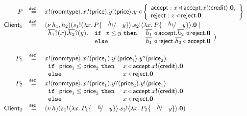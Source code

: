 \newcommand{\rtype}{\mathsf{roomtype}}
\newcommand{\price}{\mathsf{price}}
\newcommand{\accept}{\mathsf{accept}}
\newcommand{\reject}{\mathsf{reject}}
\newcommand{\creditc}{\mathsf{credit}}

\newcommand{\Client}{\mathsf{Client}}

\[
	\begin{array}{rcl}
		P &\defeq& \bout{x}{\rtype} \binp{x}{\price} \bout{y}{\price}
		y \triangleleft \left\{
				\begin{array}{l}
					\accept: \bsel{x}{\accept} \bout{x}{\creditc} \inact,\\
					\reject: \bsel{x}{\reject} \inact
				\end{array}
				\right\}
		\\
		\Client_1 &\defeq& \newsp{h_1, h_2}{\bout{s_1}{\abs{x}{P \subst{h_1}{y}}} \bout{s_2}{\abs{x}{P \subst{h_1}{y}}} \inact \Par\\
			&&
			\begin{array}{lll}
				\binp{\dual{h_1}}{x} \binp{\dual{h_2}}{y} & \If\ x \leq y\ \Then & \bsel{\dual{h_1}}{\accept} \bsel{\dual{h_2}}{\reject} \inact\\
				& \Else& \bsel{\dual{h_1}}{\reject} \bsel{\dual{h_2}}{\accept} \inact
			\end{array}
		}
		\\
		\\
		P_1 &\defeq&	\bout{x}{\rtype} \binp{x}{\price_1} \bout{y}{\price_1} \binp{y}{\price_2}\\
			&&
				\begin{array}{ll}
					\If\ \price_1 \leq \price_2\ \Then & \bsel{x}{\accept} \bout{x}{\creditc} \inact\\
					\Else & \bsel{x}{\reject} \inact
				\end{array}
		\\
		P_2 &\defeq&	\bout{x}{\rtype} \binp{x}{\price_1} \binp{y}{\price_2} \bout{y}{\price_1}\\
			&&
				\begin{array}{ll}
					\If\ \price_1 \leq \price_2\ \Then & \bsel{x}{\accept} \bout{x}{\creditc} \inact\\
					\Else & \bsel{x}{\reject} \inact
				\end{array}
		\\
		\Client_2 &\defeq& \newsp{h}{\bout{s_1}{\abs{x}{P_1 \subst{h}{y}}} \bout{s_2}{\abs{x}{P_2 \subst{\dual{h}}{y}}} \inact}
	\end{array}
\]

